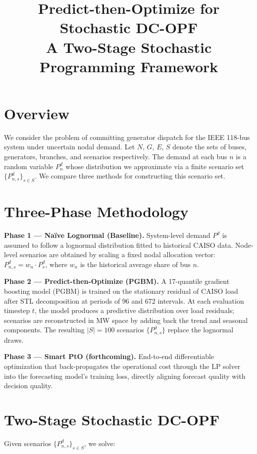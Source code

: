 \documentclass[11pt]{article}
\title{\textbf{Predict-then-Optimize for Stochastic DC-OPF}\\[4pt]
\large A Two-Stage Stochastic Programming Framework}
\author{}
\date{}
\begin{document}
\maketitle
\vspace{-1.5em}

\section{Overview}

We consider the problem of committing generator dispatch for the IEEE 118-bus system under uncertain nodal demand. Let $N$, $G$, $E$, $S$ denote the sets of buses, generators, branches, and scenarios respectively. The demand at each bus $n$ is a random variable $P^d_{n}$ whose distribution we approximate via a finite scenario set $\{P^d_{n,s}\}_{s \in S}$. We compare three methods for constructing this scenario set.

\section{Three-Phase Methodology}

\textbf{Phase 1 — Na\"ive Lognormal (Baseline).} System-level demand $P^d$ is assumed to follow a lognormal distribution fitted to historical CAISO data. Node-level scenarios are obtained by scaling a fixed nodal allocation vector: $P^d_{n,s} = w_n \cdot P^d_s$, where $w_n$ is the historical average share of bus $n$.

\textbf{Phase 2 — Predict-then-Optimize (PGBM).} A 17-quantile gradient boosting model (PGBM) is trained on the stationary residual of CAISO load after STL decomposition at periods of 96 and 672 intervals. At each evaluation timestep $t$, the model produces a predictive distribution over load residuals; scenarios are reconstructed in MW space by adding back the trend and seasonal components. The resulting $|S| = 100$ scenarios $\{P^d_{n,s}\}$ replace the lognormal draws.

\textbf{Phase 3 — Smart PtO (forthcoming).} End-to-end differentiable optimization that back-propagates the operational cost through the LP solver into the forecasting model's training loss, directly aligning forecast quality with decision quality.

\section{Two-Stage Stochastic DC-OPF}

Given scenarios $\{P^d_{n,s}\}_{s\in S}$, we solve:
\end{document}
